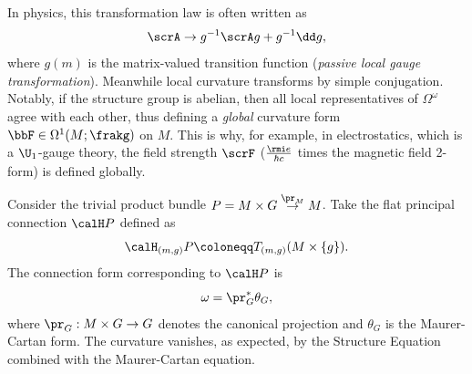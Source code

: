 \begin{rem}
    In physics, this transformation law is often written as 
    \[\scrA\to g^{-1}\scrA g+g^{-1}\dd g,\]
    where $g(m)$ is the matrix-valued transition function (\emph{passive local gauge transformation}). Meanwhile local curvature transforms by simple conjugation. Notably, if the structure group is abelian, then all local representatives of $\Omega^\omega$ agree with each other, thus defining a \emph{global} curvature form $\bbF\in\Omega^1(M;\frakg)$ on $M$. This is why, for example, in electrostatics, which is a $\U_1$-gauge theory, the field strength $\scrF$ ($\frac{\rmi e}{\hbar c}$ times the magnetic field 2-form) is defined globally.
\end{rem}
 



\begin{example}\label{ex 1.3.18 RS2}
    Consider the trivial product bundle $P=M\times G\overset{\pr_M}{\to}M$. Take the flat principal connection $\calH P$ defined as 
    \[\calH_{(m,g)}P\coloneqq T_{(m,g)}(M\times \{g\}).\]
    The connection form corresponding to $\calH P$ is
    \[\omega=\pr_G^\ast \theta_G,\]
    where $\pr_G:M\times G\to G$ denotes the canonical projection and $\theta_G$ is the Maurer-Cartan form. The curvature vanishes, as expected, by the Structure Equation combined with the Maurer-Cartan equation.
\end{example}

